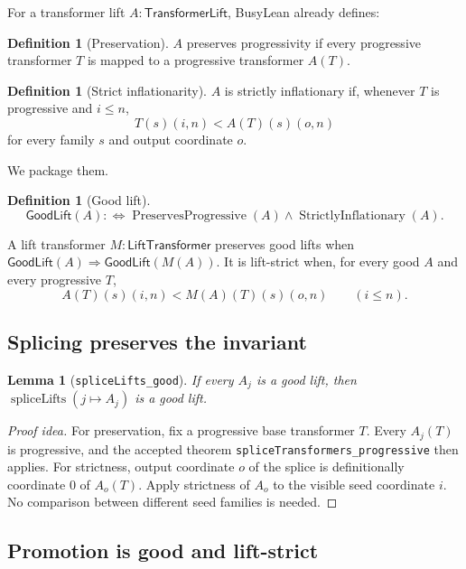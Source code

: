 \documentclass[11pt]{article}
\newtheorem{lemma}[theorem]{Lemma}
\theoremstyle{definition}
\newtheorem{definition}[theorem]{Definition}
\theoremstyle{remark}
\newcommand{\TLift}{\mathsf{TransformerLift}}
\newcommand{\LLift}{\mathsf{LiftTransformer}}
\newcommand{\Good}{\mathsf{GoodLift}}
\newcommand{\leanname}[1]{\nolinkurl{#1}}
\begin{document}
For a transformer lift $A:\TLift$, BusyLean already defines:

\begin{definition}[Preservation]
$A$ preserves progressivity if every progressive transformer $T$ is mapped to a
progressive transformer $A(T)$.
\end{definition}

\begin{definition}[Strict inflationarity]
$A$ is strictly inflationary if, whenever $T$ is progressive and $i\le n$,
\[
  T(s)(i,n)<A(T)(s)(o,n)
\]
for every family $s$ and output coordinate $o$.
\end{definition}

We package them.

\begin{definition}[Good lift]
\[
  \Good(A) :\Longleftrightarrow
  \operatorname{PreservesProgressive}(A)
  \wedge \operatorname{StrictlyInflationary}(A).
\]
\end{definition}

A lift transformer $M:\LLift$ preserves good lifts when
$\Good(A)\Rightarrow\Good(M(A))$.  It is lift-strict when, for every good $A$
and every progressive $T$,
\[
  A(T)(s)(i,n)<M(A)(T)(s)(o,n)
  \qquad(i\le n).
\]

\subsection{Splicing preserves the invariant}

\begin{lemma}[\leanname{spliceLifts_good}]
If every $A_j$ is a good lift, then
$\operatorname{spliceLifts}(j\mapsto A_j)$ is a good lift.
\end{lemma}

\begin{proof}[Proof idea]
For preservation, fix a progressive base transformer $T$.  Every $A_j(T)$ is
progressive, and the accepted theorem \leanname{spliceTransformers_progressive}
then applies.  For strictness, output coordinate $o$ of the splice is
definitionally coordinate $0$ of $A_o(T)$.  Apply strictness of $A_o$ to the
visible seed coordinate $i$.  No comparison between different seed families is
needed.
\end{proof}

\subsection{Promotion is good and lift-strict}
\end{document}
